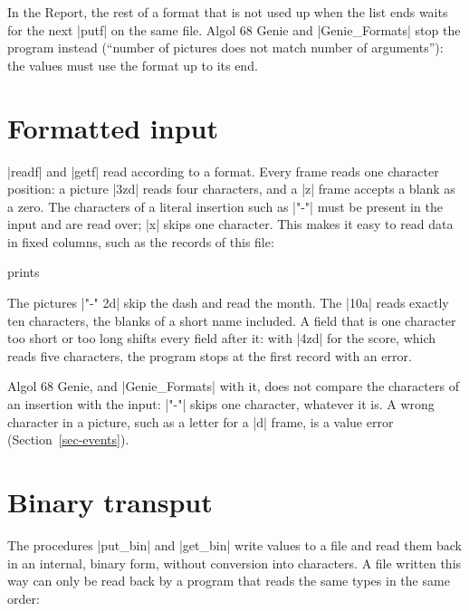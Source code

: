 \begin{implnote}
In the Report, the rest of a format that is not used up when the list
ends waits for the next \code|putf| on the same file. Algol 68 Genie and
\code|Genie_Formats| stop the program instead (``number of pictures does
not match number of arguments''): the values must use the format up to
its end.
\end{implnote}

\section{Formatted input}\label{sec-readf}

\code|readf| and \code|getf| read according to a format. Every frame
reads one character position: a picture \code|3zd| reads four
characters, and a \code|z| frame accepts a blank as a zero. The
characters of a literal insertion such as \code|"-"| must be present in
the input and are read over; \code|x| skips one character. This makes it easy to read data in fixed columns, such as
the records of this file:



\noindent prints

The pictures \code|"-" 2d| skip the dash and read the month. The
\code|10a| reads exactly ten characters, the blanks of a short name
included. A field that is one character too short or too long shifts
every field after it: with \code|4zd| for the score, which reads five
characters, the program stops at the first record with an error.

\begin{implnote}
Algol 68 Genie, and \code|Genie_Formats| with it, does not compare the
characters of an insertion with the input: \code|"-"| skips one
character, whatever it is. A wrong character in a picture, such as a
letter for a \code|d| frame, is a value error (Section~\ref{sec-events}).
\end{implnote}

\section{Binary transput}\label{sec-binary}

The procedures \code|put_bin| and \code|get_bin| write values to a file
and read them back in an internal, binary form, without conversion into
characters. A file written this way can only be read back by a program
that reads the same types in the same order:

